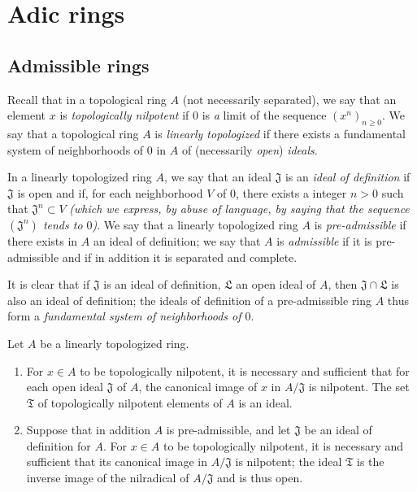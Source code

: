 \section{Adic rings}
\label{section-adic-rings}

\subsection{Admissible rings}
\label{subsection-admissible-rings}

\begin{env}[7.1.1]
\label{0.7.1.1}
Recall that in a topological ring $A$ (not necessarily separated), we say that an element $x$
is {\em topologically nilpotent} if $0$ is {\em a} limit of the sequence
$(x^n)_{n\geqslant 0}$. We say that a topological ring $A$ is {\em linearly topologized} if
there exists a fundamental system of neighborhoods of $0$ in $A$ of (necessarily {\em open})
{\em ideals}.
\end{env}

\begin{defn}[7.1.2]
\label{0.7.1.2}
In a linearly topologized ring $A$, we say that an ideal $\mathfrak{J}$ is an {\em ideal of
definition} if $\mathfrak{J}$ is open and if, for each neighborhood $V$ of $0$, there exists
a integer $n>0$ such
that $\mathfrak{J}^n\subset V$ {\em (which we express, by abuse of language, by saying that
the sequence $(\mathfrak{J}^n)$ {\em tends to $0$})}. We say that a linearly topologized
ring $A$ is {\em pre-admissible} if there exists in $A$ an ideal of definition; we say that
$A$ is {\em admissible} if it is pre-admissible and if in addition it is separated and
complete.
\end{defn}

It is clear that if $\mathfrak{J}$ is an ideal of definition, $\mathfrak{L}$ an open ideal of
$A$, then $\mathfrak{J}\cap\mathfrak{L}$ is also an ideal of definition; the ideals of
definition of a pre-admissible ring $A$ thus form a {\em fundamental system of neighborhoods
of $0$}.

\begin{lem}[7.1.3]
\label{0.7.1.3}
Let $A$ be a linearly topologized ring.
\begin{enumerate}[label={\rm(\roman*)}]
  \item For $x\in A$ to be topologically nilpotent, it is necessary and sufficient that for
    each open ideal $\mathfrak{J}$ of $A$, the canonical image of $x$ in $A/\mathfrak{J}$ is
    nilpotent. The set $\mathfrak{T}$ of topologically nilpotent elements of $A$ is an ideal.
  \item Suppose that in addition $A$ is pre-admissible, and let $\mathfrak{J}$ be an ideal
    of definition for $A$. For $x\in A$ to be topologically nilpotent, it is necessary and
    sufficient that its canonical image in $A/\mathfrak{J}$ is nilpotent; the ideal
    $\mathfrak{T}$ is the inverse image of the nilradical of $A/\mathfrak{J}$ and is thus open.
\end{enumerate}
\end{lem}


